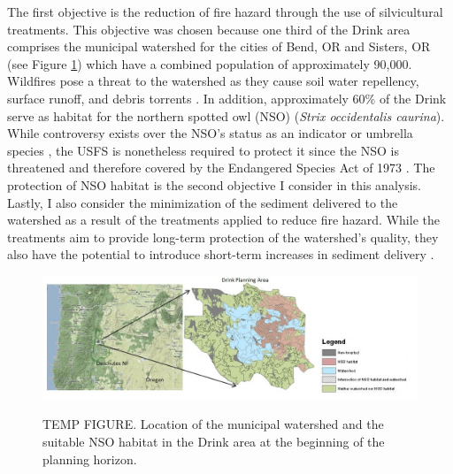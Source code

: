 The first objective is the reduction of fire hazard through the use of silvicultural treatments. This objective was chosen because one third of the Drink area comprises the municipal watershed for the cities of Bend, OR and Sisters, OR (see Figure \ref{fig:drinkOwlAndWatershed}) which have a combined population of approximately 90,000. Wildfires pose a threat to the watershed as they cause soil water repellency, surface runoff, and debris torrents \cite{ice2004effects}. In addition, approximately 60\% of the Drink serve as habitat for the northern spotted owl (NSO) (\textit{Strix occidentalis caurina}). While controversy exists over the NSO's status as an indicator or umbrella species \cite{simberloff1998flagships}, the USFS is nonetheless required to protect it since the NSO is threatened and therefore covered by the Endangered Species Act of 1973 \cite{congress1973endangered}. The protection of NSO habitat is the second objective I consider in this analysis. Lastly, I also consider the minimization of the sediment delivered to the watershed as a result of the treatments applied to reduce fire hazard. While the treatments aim to provide long-term protection of the watershed's quality, they also have the potential to introduce short-term increases in sediment delivery \cite{o2005conceptual}.
\begin{figure}
\centering
\includegraphics[width=.9\textwidth]{../images/drinkOwlAndWatershed}
\label{fig:drinkOwlAndWatershed}
\caption[NSO Habitat and municipal watershed in the Drink Area]{TEMP FIGURE. Location of the municipal watershed and the suitable NSO habitat in the Drink area at the beginning of the planning horizon.}
\end{figure}

